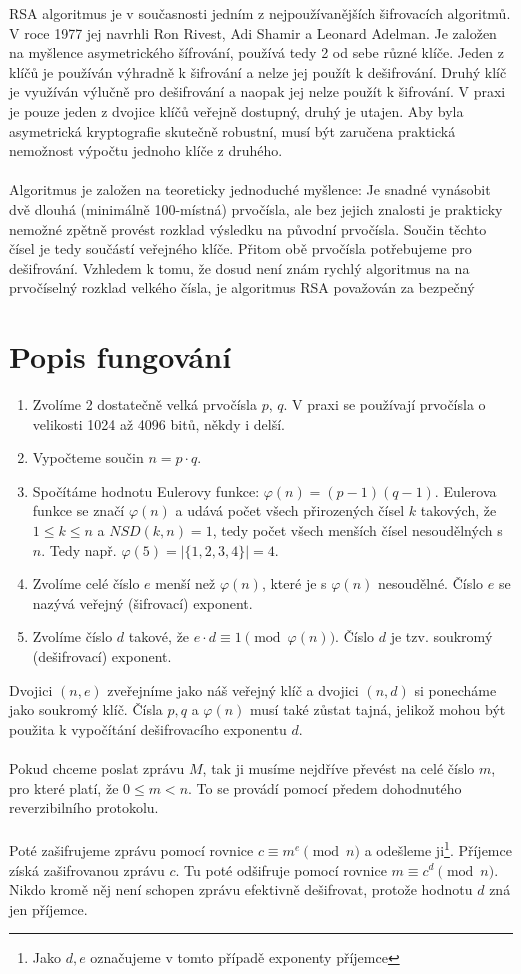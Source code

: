 \documentclass[12pt,a4paper]{report}
\begin{document}
RSA algoritmus je v současnosti jedním z nejpoužívanějších šifrovacích
algoritmů.  V roce 1977 jej navrhli Ron Rivest, Adi Shamir a Leonard Adelman. Je založen na myšlence asymetrického šífrování, používá tedy 2 od sebe různé klíče. Jeden z klíčů je používán výhradně k šifrování a nelze jej použít k dešifrování. Druhý klíč je využíván výlučně pro dešifrování a naopak jej nelze použít k šifrování. V praxi je pouze jeden z dvojice klíčů veřejně dostupný, druhý je utajen. Aby byla asymetrická kryptografie skutečně robustní, musí být zaručena praktická nemožnost výpočtu jednoho klíče z druhého.
\\\\
Algoritmus je založen na teoreticky jednoduché myšlence: Je snadné vynásobit dvě
dlouhá (minimálně 100-místná) prvočísla, ale bez jejich znalosti je prakticky nemožné
zpětně provést rozklad výsledku na původní prvočísla. Součin těchto čísel je tedy
součástí veřejného klíče. Přitom obě prvočísla potřebujeme pro dešifrování. Vzhledem
k tomu, že dosud není znám rychlý algoritmus na na prvočíselný rozklad velkého čísla, je
algoritmus RSA považován za bezpečný

\section{Popis fungování}

\begin{enumerate}
\item Zvolíme 2 dostatečně velká prvočísla $p$, $q$. V praxi se používají
prvočísla o velikosti 1024 až 4096 bitů, někdy i delší.
\item Vypočteme součin $n=p\cdot q$.
\item Spočítáme hodnotu Eulerovy funkce: $ \varphi(n)=(p-1)(q-1)$. Eulerova funkce se značí $\varphi(n)$ a udává počet všech přirozených čísel $k$ takových, že $1\leq k \leq n$ a $NSD(k,n)=1$, tedy počet všech menších čísel nesoudělných s $n$. Tedy např. $ \varphi(5) = |\{1,2,3,4\}|=4$.
\item Zvolíme celé číslo $e$ menší než $\varphi(n)$, které je s $\varphi(n)$ nesoudělné.  Číslo $e$ se nazývá veřejný (šifrovací) exponent. 
\item Zvolíme číslo $d$ takové, že $e\cdot d \equiv 1 \pmod{ \varphi(n)} $.  Číslo $d$ je tzv. soukromý (dešifrovací) exponent.
\end{enumerate}
Dvojici $(n,e)$ zveřejníme jako náš veřejný klíč a dvojici $(n,d)$ si ponecháme jako soukromý klíč. Čísla $p, q$ a $\varphi(n)$ musí také zůstat tajná, jelikož mohou být
použita k vypočítání dešifrovacího exponentu $d$.
\\\\
Pokud chceme poslat zprávu $M$, tak ji musíme nejdříve
převést na celé číslo $m$, pro které platí, že $0 \leq m < n$. To se provádí
pomocí předem dohodnutého reverzibilního protokolu.
\\\\Poté zašifrujeme zprávu pomocí rovnice $c \equiv m^e \pmod n$ a odešleme ji\footnote{Jako $d,e$ označujeme v tomto případě exponenty příjemce}. Příjemce získá zašifrovanou zprávu $c$. Tu poté odšifruje pomocí rovnice $m \equiv c^d \pmod n$. Nikdo kromě něj není schopen zprávu efektivně dešifrovat, protože hodnotu $d$ zná jen příjemce.
\end{document}
